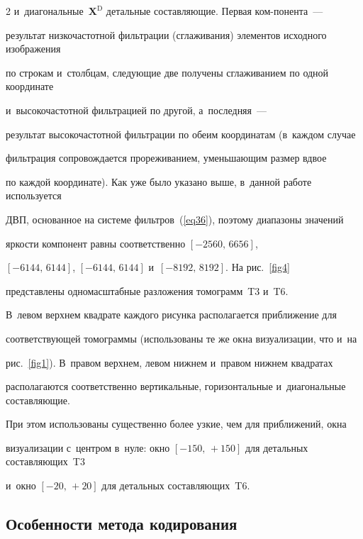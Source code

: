 \begin{multicols}{2}
и~диагональные~$\mathbf{X}^{\mathrm{D}}$ детальные составляющие. Первая ком-\linebreak понента~--- 

результат низкочастотной фильтрации (сглаживания) элементов исходного изображения 

по строкам и~столбцам, следующие две получены сглаживанием по одной координате 

и~вы\-со\-ко\-час\-тот\-ной фильтрацией по другой, а~последняя~--- 

результат высокочастотной фильтрации по обеим координатам (в~каждом случае 

фильт\-ра\-ция сопровождается прореживанием, уменьшающим размер вдвое 

по каждой координате). Как уже было указано выше, в~данной работе используется 

ДВП, основанное на системе фильтров~(\ref{eq36}), поэтому диапазоны значений 

яркости компонент равны соответственно  $[-2560,\,6656]$, 

$[-6144,\,6144]$, $[-6144,\,6144]$ и~$[-8192,\,8192]$. На рис.~\ref{fig4} 

представлены одномасштабные разложения томограмм~T3 и~T6. 

В~левом верхнем квадрате каждого рисунка располагается приближение для 

соответствующей томограммы (использованы те же окна визуализации, что и~на 

рис.~\ref{fig1}). В~правом верхнем, левом нижнем и~правом нижнем квадратах 

располагаются соответственно вертикальные, горизонтальные и~диагональные составляющие. 

При этом использованы существенно более узкие, чем для приближений, окна 

визуализации с~центром в~нуле: окно $[-150,\,+150]$ для детальных составляющих~T3 

и~окно $[-20,\,+20]$ для детальных составляющих~T6.



\vspace*{-4pt}





\subsection{Особенности метода кодирования}






\end{multicols}
